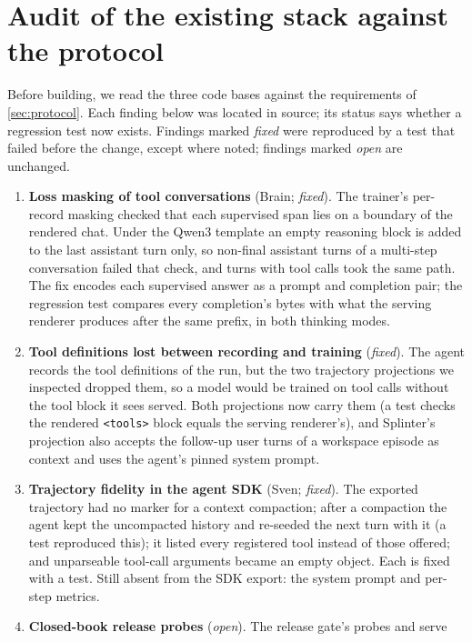 
\section{Audit of the existing stack against the protocol}\label{sec:audit}

Before building, we read the three code bases against the requirements of
\cref{sec:protocol}. Each finding below was located in source; its status says whether a
regression test now exists. Findings marked \emph{fixed} were reproduced by a test that failed
before the change, except where noted; findings marked \emph{open} are unchanged.

\begin{enumerate}
\item \textbf{Loss masking of tool conversations} (Brain; \emph{fixed}). The trainer's
per-record masking checked that each supervised span lies on a boundary of the rendered
chat. Under the Qwen3 template an empty reasoning block is added to the last assistant turn
only, so non-final assistant turns of a multi-step conversation failed that check, and turns
with tool calls took the same path. The fix encodes each supervised answer as a prompt and
completion pair; the regression test compares every completion's bytes with what the serving
renderer produces after the same prefix, in both thinking modes.
\item \textbf{Tool definitions lost between recording and training} (\emph{fixed}). The
agent records the tool definitions of the run, but the two trajectory projections we
inspected dropped them, so a model would be trained on tool calls without the tool block it sees
served. Both projections now carry them (a test checks the rendered \texttt{<tools>} block
equals the serving renderer's), and Splinter's projection also accepts the follow-up user turns
of a workspace episode as context and uses the agent's pinned system prompt.
\item \textbf{Trajectory fidelity in the agent SDK} (Sven; \emph{fixed}). The exported
trajectory had no marker for a context compaction; after a compaction the agent kept the
uncompacted history and re-seeded the next turn with it (a test reproduced this); it listed
every registered tool instead of those offered; and unparseable tool-call arguments became an
empty object. Each is fixed with a test. Still absent from the SDK export: the system prompt
and per-step metrics.
\item \textbf{Closed-book release probes} (\emph{open}). The release gate's probes and serve

\end{enumerate}
